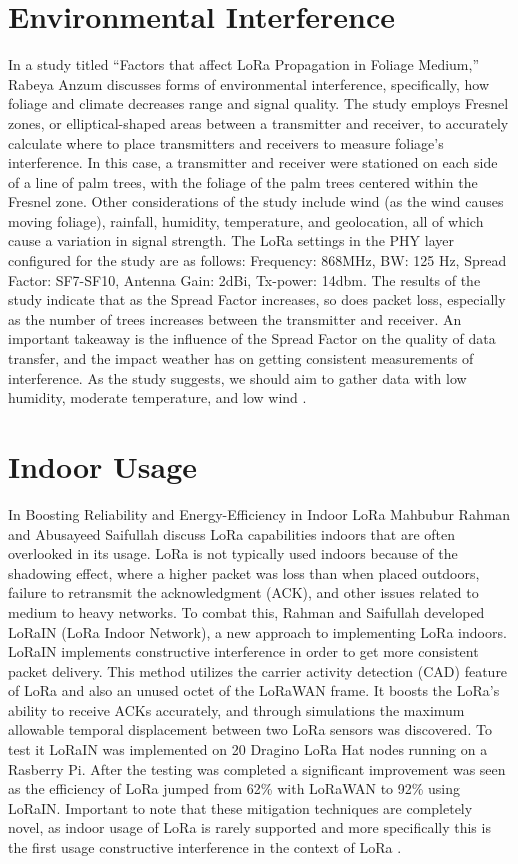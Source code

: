 \documentclass[sigsmall]{acmart}
\begin{document}
\section*{Environmental Interference}
In a study titled “Factors that affect LoRa Propagation in Foliage Medium,” Rabeya Anzum discusses forms of environmental interference, specifically, how foliage and climate decreases range and signal quality. The study employs Fresnel zones, or elliptical-shaped areas between a transmitter and receiver, to accurately calculate where to place transmitters and receivers to measure foliage's interference. In this case, a transmitter and receiver were stationed on each side of a line of palm trees, with the foliage of the palm trees centered within the Fresnel zone. Other considerations of the study include wind (as the wind causes moving foliage), rainfall, humidity, temperature, and geolocation, all of which cause a variation in signal strength. The LoRa settings in the PHY layer configured for the study are as follows: Frequency: 868MHz, BW: 125 Hz, Spread Factor: SF7-SF10, Antenna Gain: 2dBi, Tx-power: 14dbm. The results of the study indicate that as the Spread Factor increases, so does packet loss, especially as the number of trees increases between the transmitter and receiver. An important takeaway is the influence of the Spread Factor on the quality of data transfer, and the impact weather has on getting consistent measurements of interference. As the study suggests, we should aim to gather data with low humidity, moderate temperature, and low wind  \cite{anzum2021factors}. 

\section*{Indoor Usage}
In Boosting Reliability and Energy-Efficiency in Indoor LoRa Mahbubur Rahman and Abusayeed Saifullah discuss LoRa capabilities indoors that are often overlooked in its usage. LoRa is not typically used indoors because of the shadowing effect, where a higher packet was loss than when placed outdoors, failure to retransmit the acknowledgment (ACK), and other issues related to medium to heavy networks. To combat this, Rahman and Saifullah developed LoRaIN (LoRa Indoor Network), a new approach to implementing LoRa indoors. LoRaIN implements constructive interference in order to get more consistent packet delivery. This method utilizes the carrier activity detection (CAD) feature of LoRa and also an unused octet of the LoRaWAN frame. It boosts the LoRa's ability to receive ACKs accurately, and through simulations the maximum allowable temporal displacement between two LoRa sensors was discovered. To test it LoRaIN was implemented on 20 Dragino LoRa Hat nodes running on a Rasberry Pi. After the testing was completed a significant improvement was seen as the efficiency of LoRa jumped from 62\% with LoRaWAN to 92\% using LoRaIN. Important to note that these mitigation techniques are completely novel, as indoor usage of LoRa is rarely supported and more specifically this is the first usage constructive interference in the context of LoRa \cite{10.1145/3576842.3582327}. 
\end{document}
